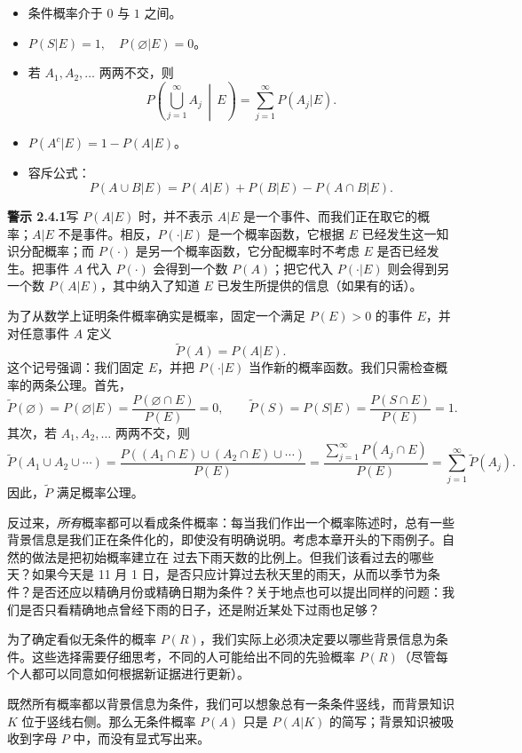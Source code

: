 \documentclass[UTF8, 12pt, fontset=fandol, oneside]{ctexart}
\begin{document}
\begin{itemize}
  \item 条件概率介于 $0$ 与 $1$ 之间。
  \item $P(S|E)=1,\quad P(\varnothing|E)=0$。
  \item 若 $A_1,A_2,\ldots$ 两两不交，则
  \[
    P\left(\bigcup_{j=1}^{\infty}A_j\,\middle|\,E\right)
    =
    \sum_{j=1}^{\infty}P(A_j|E).
  \]
  \item $P(A^c|E)=1-P(A|E)$。
  \item 容斥公式：
  \[
    P(A\cup B|E)=P(A|E)+P(B|E)-P(A\cap B|E).
  \]
\end{itemize}

\noindent\textbf{警示 2.4.1}\quad 写 $P(A|E)$ 时，并不表示 $A|E$ 是一个事件、而我们正在取它的概率；$A|E$ 不是事件。相反，$P(\cdot|E)$ 是一个概率函数，它根据 $E$ 已经发生这一知识分配概率；而 $P(\cdot)$ 是另一个概率函数，它分配概率时不考虑 $E$ 是否已经发生。把事件 $A$ 代入 $P(\cdot)$ 会得到一个数 $P(A)$；把它代入 $P(\cdot|E)$ 则会得到另一个数 $P(A|E)$，其中纳入了知道 $E$ 已发生所提供的信息（如果有的话）。

为了从数学上证明条件概率确实是概率，固定一个满足 $P(E)>0$ 的事件 $E$，并对任意事件 $A$ 定义
\[
  \widetilde P(A)=P(A|E).
\]
这个记号强调：我们固定 $E$，并把 $P(\cdot|E)$ 当作新的概率函数。我们只需检查概率的两条公理。首先，
\[
  \widetilde P(\varnothing)=P(\varnothing|E)
  =
  \frac{P(\varnothing\cap E)}{P(E)}=0,\qquad
  \widetilde P(S)=P(S|E)
  =
  \frac{P(S\cap E)}{P(E)}=1.
\]
其次，若 $A_1,A_2,\ldots$ 两两不交，则
\[
  \widetilde P(A_1\cup A_2\cup\cdots)
  =
  \frac{P((A_1\cap E)\cup(A_2\cap E)\cup\cdots)}{P(E)}
  =
  \frac{\sum_{j=1}^{\infty}P(A_j\cap E)}{P(E)}
  =
  \sum_{j=1}^{\infty}\widetilde P(A_j).
\]
因此，$\widetilde P$ 满足概率公理。

反过来，\textit{所有}概率都可以看成条件概率：每当我们作出一个概率陈述时，总有一些背景信息是我们正在条件化的，即使没有明确说明。考虑本章开头的下雨例子。自然的做法是把初始概率建立在
过去下雨天数的比例上。但我们该看过去的哪些天？如果今天是 11 月 1 日，是否只应计算过去秋天里的雨天，从而以季节为条件？是否还应以精确月份或精确日期为条件？关于地点也可以提出同样的问题：我们是否只看精确地点曾经下雨的日子，还是附近某处下过雨也足够？

为了确定看似无条件的概率 $P(R)$，我们实际上必须决定要以哪些背景信息为条件。这些选择需要仔细思考，不同的人可能给出不同的先验概率 $P(R)$（尽管每个人都可以同意如何根据新证据进行更新）。

既然所有概率都以背景信息为条件，我们可以想象总有一条条件竖线，而背景知识 $K$ 位于竖线右侧。那么无条件概率 $P(A)$ 只是 $P(A|K)$ 的简写；背景知识被吸收到字母 $P$ 中，而没有显式写出来。
\end{document}
